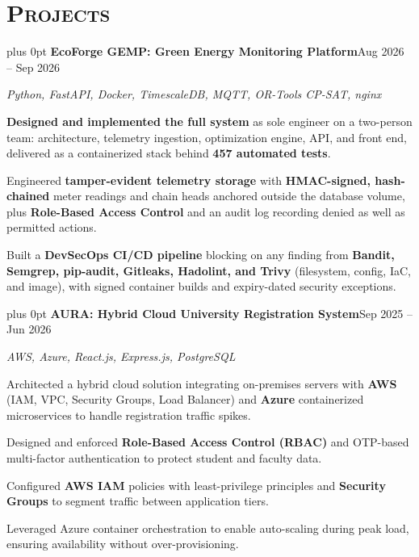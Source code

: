 \documentclass[10pt,letterpaper]{article}
\newcommand{\headerrow}[2]{%
  \begingroup\rightskip=0pt plus 0pt\relax
  #1\hfill #2\par\endgroup}
\newcommand{\project}[3]{%
  \headerrow{\textbf{#1}}{#2}%
  \textit{#3}\par\vspace{0.08em}}
\newenvironment{block}{\vspace{0.03em}\begingroup}{\endgroup\vspace{0.06em}}
\begin{document}
\section*{\textsc{Projects}}
\begin{block}

\project{EcoForge GEMP: Green Energy Monitoring Platform}{Aug 2026 -- Sep 2026}
        {Python, FastAPI, Docker, TimescaleDB, MQTT, OR-Tools CP-SAT, nginx}
\begin{tight}
  \item \textbf{Designed and implemented the full system} as sole engineer on a two-person team: architecture, telemetry ingestion, optimization engine, API, and front end, delivered as a containerized stack behind \textbf{457 automated tests}.
  \item Engineered \textbf{tamper-evident telemetry storage} with \textbf{HMAC-signed, hash-chained} meter readings and chain heads anchored outside the database volume, plus \textbf{Role-Based Access Control} and an audit log recording denied as well as permitted actions.
  \item Built a \textbf{DevSecOps CI/CD pipeline} blocking on any finding from \textbf{Bandit, Semgrep, pip-audit, Gitleaks, Hadolint, and Trivy} (filesystem, config, IaC, and image), with signed container builds and expiry-dated security exceptions.
\end{tight}
\vspace{0.18em}

\project{AURA: Hybrid Cloud University Registration System}{Sep 2025 -- Jun 2026}
        {AWS, Azure, React.js, Express.js, PostgreSQL}
\begin{tight}
  \item Architected a hybrid cloud solution integrating on-premises servers with \textbf{AWS} (IAM, VPC, Security Groups, Load Balancer) and \textbf{Azure} containerized microservices to handle registration traffic spikes.
  \item Designed and enforced \textbf{Role-Based Access Control (RBAC)} and OTP-based multi-factor authentication to protect student and faculty data.
  \item Configured \textbf{AWS IAM} policies with least-privilege principles and \textbf{Security Groups} to segment traffic between application tiers.
  \item Leveraged Azure container orchestration to enable auto-scaling during peak load, ensuring availability without over-provisioning.
\end{tight}
\vspace{0.18em}


\end{block}
\end{document}

